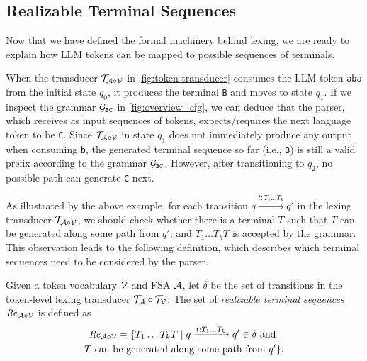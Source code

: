 \subsection{Realizable Terminal Sequences}
\label{sec:realizable}

Now that we have defined the formal machinery behind lexing, we are ready to explain how LLM tokens can be mapped to possible sequences of terminals.

When the transducer $\mathcal{T}_{\mathcal{A} \circ \mathcal{V}}$ in \autoref{fig:token-transducer} consumes the LLM token \texttt{aba} from the initial state $q_0$, it produces the terminal \texttt{B} and moves to state $q_1$. 
If we inspect the grammar $\mathcal{G}_{\texttt{BC}}$ in \autoref{fig:overview_cfg}, we can deduce that the parser, which receives as input sequences of tokens, expects/requires the next language token to be \texttt{C}.
Since $\mathcal{T}_{\mathcal{A} \circ \mathcal{V}}$ in state $q_1$ does not immediately produce any output when consuming \texttt{b}, 
the generated terminal sequence so far (i.e., \texttt{B}) is still a valid prefix according to the grammar $\mathcal{G}_{\texttt{BC}}$.
However, after transitioning to $q_2$, no possible path can generate \texttt{C} next.

As illustrated by the above example, for each transition $q \xrightarrow{t:T_1 \ldots T_k} q'$ in the lexing transducer $\mathcal{T}_{\mathcal{A} \circ \mathcal{V}}$, we should check whether there is a terminal $T$ such that \rone  $T$ can be generated along some path from $q'$, and \rtwo $T_1 \ldots T_k T$ is accepted by the grammar.
%
This observation leads to the following definition, which describes which terminal sequences need to be considered by the parser.

\begin{definition}
\label{def:realizable-term-seq}
Given a token vocabulary $\mathcal{V}$ and FSA $\mathcal{A}$, let $\delta$ be the set of transitions in the token-level lexing transducer $\mathcal{T}_{\mathcal{A}} \circ \mathcal{T}_{\mathcal{V}}$.
% 
The set of \textit{realizable terminal sequences} $\mathit{Re}_{\mathcal{A} \circ \mathcal{V}}$ is defined as 
\begin{multline*}
\mathit{Re}_{\mathcal{A} \circ \mathcal{V}} = \{ T_1 \ldots T_k T \mid q \xrightarrow{t:T_1 \ldots T_k} q' \in \delta \textrm{ and } \\
T \textrm{ can be generated along some path from } q' \}.
\end{multline*}
\end{definition}

